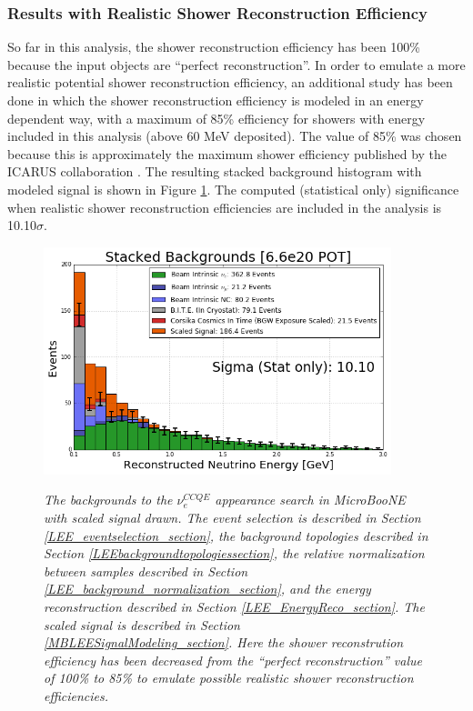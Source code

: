 \subsubsection{Results with Realistic Shower Reconstruction Efficiency}
So far in this analysis, the shower reconstruction efficiency has been 100\% because the input objects are ``perfect reconstruction''. In order to emulate a more realistic potential shower reconstruction efficiency, an additional study has been done in which the shower reconstruction efficiency is modeled in an energy dependent way, with a maximum of 85\% efficiency for showers with energy included in this analysis (above 60 MeV deposited). The value of 85\% was chosen because this is approximately the maximum shower efficiency published by the ICARUS collaboration \cite{ICARUS_showereff_source}. The resulting stacked background histogram with modeled signal is shown in Figure \ref{LEE_recoemu_fullstack_fig}. The computed (statistical only) significance when realistic shower reconstruction efficiencies are included in the analysis is 10.10$\sigma$.


\begin{figure}[ht!]
\centering
\includegraphics[width=0.9\textwidth]{Figures/LEE_recoemu_fullstack_WithAnalysisCuts.png}\\
\caption{\textit{The backgrounds to the $\nu_e^{CCQE}$ appearance search in MicroBooNE with scaled signal drawn. The event selection is described in Section \ref{LEE_eventselection_section}, the background topologies described in Section \ref{LEEbackgroundtopologiessection}, the relative normalization between samples described in Section \ref{LEE_background_normalization_section}, and the energy reconstruction described in Section \ref{LEE_EnergyReco_section}. The scaled signal is described in Section \ref{MBLEESignalModeling_section}. Here the shower reconstrution efficiency has been decreased from the ``perfect reconstruction'' value of 100\% to 85\% to emulate possible realistic shower reconstruction efficiencies.}}
\label{LEE_recoemu_fullstack_fig}
\end{figure}

